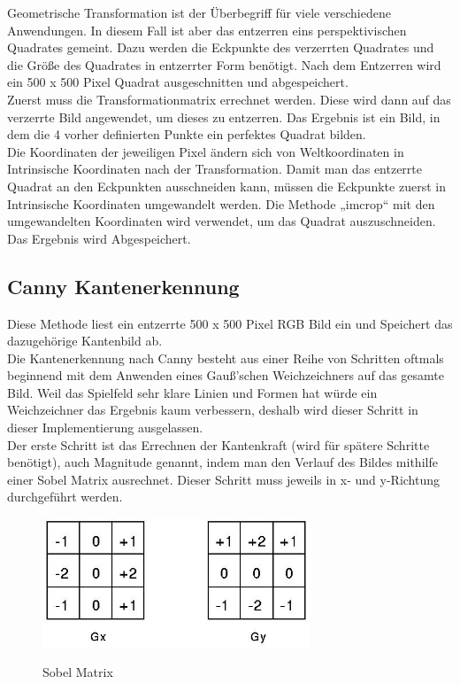 \documentclass[paper=A4, deutsch]{scrartcl}
\begin{document}
Geometrische Transformation ist der Überbegriff für viele verschiedene Anwendungen. In diesem Fall ist aber das entzerren eins perspektivischen Quadrates gemeint. Dazu werden die Eckpunkte des verzerrten Quadrates und die Größe des Quadrates in entzerrter Form benötigt. Nach dem Entzerren wird ein 500 x 500 Pixel Quadrat ausgeschnitten und abgespeichert.\\
Zuerst muss die Transformationmatrix errechnet werden. Diese wird dann auf das verzerrte Bild angewendet, um dieses zu entzerren. Das Ergebnis ist ein Bild, in dem die 4 vorher definierten Punkte ein perfektes Quadrat bilden.\\
Die Koordinaten der jeweiligen Pixel ändern sich von Weltkoordinaten in Intrinsische Koordinaten nach der Transformation. Damit man das entzerrte Quadrat an den Eckpunkten ausschneiden kann, müssen die Eckpunkte zuerst in Intrinsische Koordinaten umgewandelt werden. Die Methode „imcrop“ mit den umgewandelten Koordinaten wird verwendet, um das Quadrat auszuschneiden. Das Ergebnis wird Abgespeichert.\\

\subsection{Canny Kantenerkennung}
Diese Methode liest ein entzerrte 500 x 500 Pixel RGB Bild ein und Speichert das dazugehörige Kantenbild ab.\\
Die Kantenerkennung nach Canny besteht aus einer Reihe von Schritten oftmals beginnend mit dem Anwenden eines Gauß’schen Weichzeichners auf das gesamte Bild. Weil das Spielfeld sehr klare Linien und Formen hat würde ein Weichzeichner das Ergebnis kaum verbessern, deshalb wird dieser Schritt in dieser Implementierung ausgelassen.\\
Der erste Schritt ist das Errechnen der Kantenkraft (wird für spätere Schritte benötigt), auch Magnitude genannt, indem man den Verlauf des Bildes mithilfe einer Sobel Matrix ausrechnet. Dieser Schritt muss jeweils in x- und y-Richtung durchgeführt werden.\\ 

\begin{figure}[ht]
	\centering
		\includegraphics[width=8cm]{Sobel.png}\\
	\caption[Sobel Matrix]{Sobel Matrix}
	\label{fig:nettop}
\end{figure}
\end{document}
